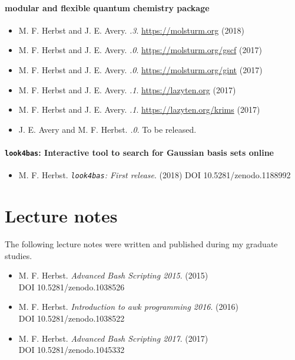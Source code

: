 \paragraph*{\molsturm modular and flexible quantum chemistry package}
\begin{itemize}
	\item M. F. Herbst and J. E. Avery.
		\textit{.3}. \url{https://molsturm.org} (2018)
	\item M. F. Herbst and J. E. Avery.
		\textit{.0}. \url{https://molsturm.org/gscf} (2017)
	\item M. F. Herbst and J. E. Avery.
		\textit{.0}. \url{https://molsturm.org/gint} (2017)
	\item M. F. Herbst and J. E. Avery.
		\textit{.1}. \url{https://lazyten.org} (2017)
	\item M. F. Herbst and J. E. Avery.
		\textit{.1}. \url{https://lazyten.org/krims} (2017)
	\item J. E. Avery and M. F. Herbst.
		\textit{.0}. To be released.
\end{itemize}

\pagebreak
\paragraph*{\texttt{look4bas}: Interactive tool to search for Gaussian basis sets online}
\begin{itemize}
	\item M. F. Herbst. \textit{\texttt{look4bas}: First release}. (2018) DOI \mbox{10.5281/zenodo.1188992}
\end{itemize}

\section*{Lecture notes}
{}
The following lecture notes were written and published during my graduate studies.
\begin{itemize}
	\item M. F. Herbst. \textit{Advanced Bash Scripting 2015}. (2015) \\
		DOI \mbox{10.5281/zenodo.1038526}
	\item M. F. Herbst. \textit{Introduction to awk programming 2016}. (2016) \\
		DOI \mbox{10.5281/zenodo.1038522}
	\item M. F. Herbst. \textit{Advanced Bash Scripting 2017}. (2017) \\
		DOI \mbox{10.5281/zenodo.1045332}
\end{itemize}

